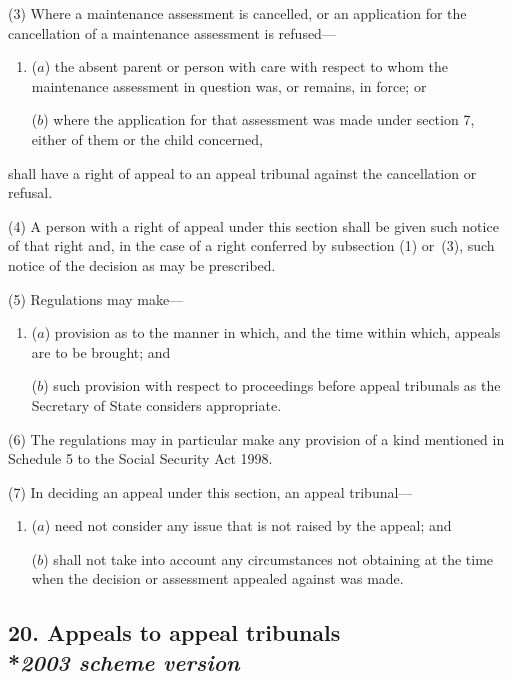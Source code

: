 \documentclass[12pt,a4paper]{article}
\begin{document}
(3) Where a maintenance assessment is cancelled, or an application for the cancellation of a maintenance assessment is refused—
\begin{enumerate}\item[]
($a$) the absent parent or person with care with respect to whom the maintenance assessment in question was, or remains, in force; or

($b$) where the application for that assessment was made under section 7, either of them or the child concerned,
\end{enumerate}
shall have a right of appeal to an appeal tribunal against the cancellation or refusal.

(4) A person with a right of appeal under this section shall be given such notice of that right and, in the case of a right conferred by subsection (1) or~(3), such notice of the decision as may be prescribed.

(5) Regulations may make—
\begin{enumerate}\item[]
($a$) provision as to the manner in which, and the time within which, appeals are to be brought; and

($b$) such provision with respect to proceedings before appeal tribunals as the Secretary of State considers appropriate.
\end{enumerate}

(6) The regulations may in particular make any provision of a kind mentioned in Schedule 5 to the Social Security Act 1998.

(7) In deciding an appeal under this section, an appeal tribunal—
\begin{enumerate}\item[]
($a$) need not consider any issue that is not raised by the appeal; and

($b$) shall not take into account any circumstances not obtaining at the time when the decision or assessment appealed against was made.
\end{enumerate}


\subsection[20. Appeals to appeal tribunals --- \emph{2003 scheme version}]{20. Appeals to appeal tribunals\\*\emph{2003 scheme version}}
\end{document}
